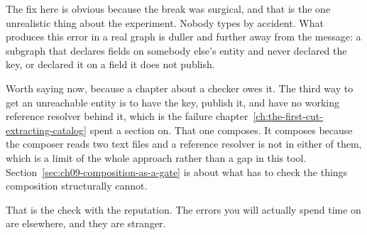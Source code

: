 %
The fix here is obvious because the break was surgical, and that is the one
unrealistic thing about the experiment. Nobody types  by
accident. What produces this error in a real graph is duller and further away
from the message: a subgraph that declares fields on somebody else's entity and
never declared the key, or declared it on a field it does not publish.

%
Worth saying now, because a chapter about a checker owes it. The third way to
get an unreachable entity is to have the key, publish it, and have no working
reference resolver behind it, which is the failure
chapter~\ref{ch:the-first-cut-extracting-catalog} spent a section on. That one
composes. It composes because the composer reads two text files and a reference
resolver is not in either of them, which is a limit of the whole approach rather
than a gap in this tool. Section~\ref{sec:ch09-composition-as-a-gate} is about
what has to check the things composition structurally cannot.

That is the check with the reputation. The errors you will actually spend time
on are elsewhere, and they are stranger.

%
